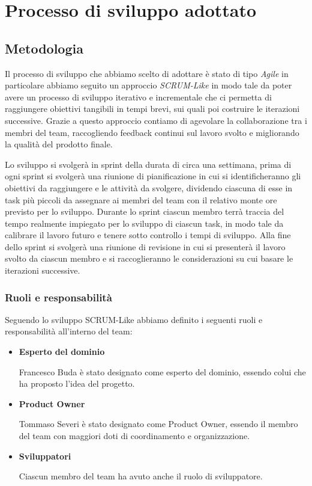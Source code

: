 \section{Processo di sviluppo adottato} \label{sec:development-process}

\subsection{Metodologia} \label{sec:development-process-methodology}
Il processo di sviluppo che abbiamo scelto di adottare è stato di tipo \textit{Agile} in particolare abbiamo seguito un approccio 
\textit{SCRUM-Like} in modo tale da poter avere un processo di sviluppo iterativo e incrementale che ci permetta di raggiungere obiettivi tangibili
in tempi brevi, sui quali poi costruire le iterazioni successive. Grazie a questo approccio contiamo di agevolare la collaborazione tra i membri
del team, raccogliendo feedback continui sul lavoro svolto e migliorando la qualità del prodotto finale.

Lo sviluppo si svolgerà in sprint della durata di circa una settimana, prima di ogni sprint si svolgerà una riunione di pianificazione
in cui si identificheranno gli obiettivi da raggiungere e le attività da svolgere, dividendo ciascuna di esse in task più piccoli da assegnare 
ai membri del team con il relativo monte ore previsto per lo sviluppo. Durante lo sprint ciascun membro terrà traccia del tempo realmente impiegato
per lo sviluppo di ciascun task, in modo tale da calibrare il lavoro futuro e tenere sotto controllo i tempi di sviluppo. Alla fine
dello sprint si svolgerà una riunione di revisione in cui si presenterà il lavoro svolto da ciascun membro e si raccoglieranno le considerazioni
su cui basare le iterazioni successive.

\subsubsection{Ruoli e responsabilità} \label{sec:development-process-roles}
Seguendo lo sviluppo SCRUM-Like abbiamo definito i seguenti ruoli e responsabilità all'interno del team:
\begin{itemize}
    \item \textbf{Esperto del dominio} \par
    Francesco Buda è stato designato come esperto del dominio, essendo colui che ha proposto l'idea del progetto.
    \item \textbf{Product Owner} \par
    Tommaso Severi è stato designato come Product Owner, essendo il membro del team con maggiori doti di coordinamento e organizzazione.
    \item \textbf{Sviluppatori} \par
    Ciascun membro del team ha avuto anche il ruolo di sviluppatore.
\end{itemize}

